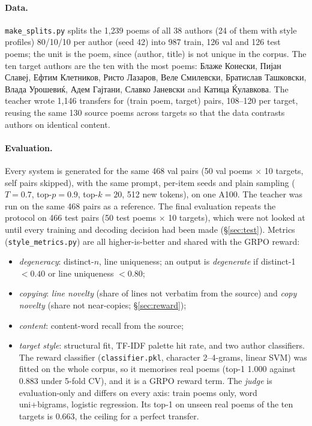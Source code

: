 \documentclass[11pt]{article}
\begin{document}
\paragraph{Data.} \texttt{make\_splits.py} splits the 1{,}239 poems of all 38
authors (24 of them with style profiles) 80/10/10 per author (seed 42) into 987 train, 126 val and 126
test poems; the unit is the poem, since (author, title) is not unique in the
corpus. The ten target authors are the ten with the most poems: Блаже
Конески, Пијан Славеј, Ефтим Клетников, Ристо Лазаров, Веле Смилевски,
Братислав Ташковски, Влада Урошевиќ, Адем Гајтани, Славко Јаневски and
Катица Ќулавкова. The teacher wrote 1{,}146 transfers for (train poem,
target) pairs, 108--120 per target, reusing the same 130 source poems across
targets so that the data contrasts authors on identical content.

\paragraph{Evaluation.} Every system is generated for the same 468 val pairs
(50 val poems $\times$ 10 targets, self pairs skipped), with the same prompt,
per-item seeds and plain sampling ($T=0.7$, top-$p=0.9$, top-$k=20$, 512 new
tokens), on one A100. The teacher was run on the same 468 pairs as a
reference. The final evaluation repeats the protocol on 466 test pairs (50
test poems $\times$ 10 targets), which were not looked at until every
training and decoding decision had been made (\S\ref{sec:test}). Metrics (\texttt{style\_metrics.py}) are all higher-is-better and
shared with the GRPO reward:
\begin{itemize}\itemsep0pt
  \item \emph{degeneracy}: distinct-$n$, line uniqueness; an output is
    \emph{degenerate} if distinct-1 $<0.40$ or line uniqueness $<0.80$;
  \item \emph{copying}: \emph{line novelty} (share of lines not verbatim from
    the source) and \emph{copy novelty} (share not near-copies; \S\ref{sec:reward});
  \item \emph{content}: content-word recall from the source;
  \item \emph{target style}: structural fit, TF-IDF palette hit rate, and two
    author classifiers. The reward classifier (\texttt{classifier.pkl},
    character 2--4-grams, linear SVM) was fitted on the whole corpus, so it
    memorises real poems (top-1 1.000 against 0.883 under 5-fold CV), and it
    is a GRPO reward term. The \emph{judge} is evaluation-only and differs on
    every axis: train poems only, word uni+bigrams, logistic regression. Its
    top-1 on unseen real poems of the ten targets is 0.663, the ceiling for a
    perfect transfer.
\end{itemize}
\end{document}
